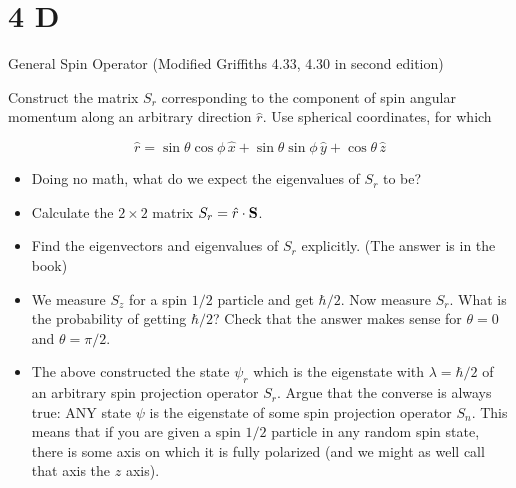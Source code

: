 \documentclass{article}
\begin{document}
\section*{4 D}
\begin{ques}\label{q4}
General Spin Operator (Modified Griffiths 4.33, 4.30 in second edition)

Construct the matrix $S_r$ corresponding to the component of spin angular momentum along an arbitrary direction $\hat{r}$. Use spherical coordinates, for which

\[
\hat{r} = \sin\theta \cos\phi\, \hat{x}
+ \sin\theta \sin\phi\, \hat{y}
+ \cos\theta\, \hat{z}
\]

\begin{itemize}
\item[(a)] Doing no math, what do we expect the eigenvalues of $S_r$ to be?
\item[(b)] Calculate the $2\times2$ matrix $S_r = \hat{r}\cdot \mathbf{S}$.
\item[(c)] Find the eigenvectors and eigenvalues of $S_r$ explicitly. (The answer is in the book)
\item[(d)] We measure $S_z$ for a spin $1/2$ particle and get $\hbar/2$. Now measure $S_r$. What is the probability of getting $\hbar/2$? Check that the answer makes sense for $\theta = 0$ and $\theta = \pi/2$.
\item[(e)] The above constructed the state $\psi_r$ which is the eigenstate with $\lambda = \hbar/2$ of an arbitrary spin projection operator $S_r$. Argue that the converse is always true: ANY state $\psi$ is the eigenstate of some spin projection operator $S_n$. This means that if you are given a spin $1/2$ particle in any random spin state, there is some axis on which it is fully polarized (and we might as well call that axis the $z$ axis).
\end{itemize}
\end{ques}
\end{document}
